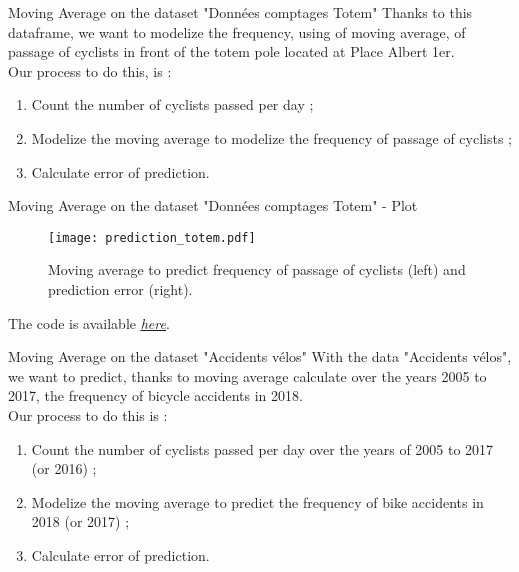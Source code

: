 \documentclass[unknownkeysallowed]{beamer}
\begin{document}
\begin{frame}{Moving Average on the dataset "Données comptages Totem"}
Thanks to this dataframe, we want to modelize the frequency, using of moving average, of passage of cyclists in front of the totem pole located at Place Albert 1er. \\
Our process to do this, is :
\begin{enumerate}
    \item Count the number of cyclists passed per day ;
    \item Modelize the moving average to modelize the frequency of passage of cyclists ;
    \item Calculate error of prediction.
\end{enumerate}
\end{frame}
 \begin{frame}{Moving Average on the dataset "Données comptages Totem" - Plot}
\begin{figure}[!h]
     \begin{center}
   \caption{\label{étiquette}Moving average to predict frequency of passage of cyclists (left) and prediction error (right).}
   \texttt{[image: prediction\_totem.pdf]}
   \end{center}
    \end{figure}
The code is available \href{https://github.com/Cindy-dotcom1/MLA/blob/master/Notebooks/Moving_Average_Totem.ipynb}{\textit{\underline{here}}}.
 \end{frame}
 \begin{frame}{Moving Average on the dataset "Accidents vélos"}
With the data "Accidents vélos", we want to predict, thanks to moving average calculate over the years 2005 to 2017, the frequency of
bicycle accidents in 2018. \\
Our process to do this is :
\begin{enumerate}
    \item Count the number of cyclists passed per day over the years of 2005 to 2017 (or 2016) ;
    \item Modelize the moving average to predict the frequency of bike accidents in 2018 (or 2017) ;
    \item Calculate error of prediction.
\end{enumerate}
\end{frame}
\end{document}
